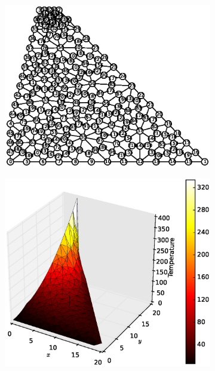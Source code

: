 \documentclass[10pt, a4paper]{article}
\begin{document}
\begin{figure}[H]
\centering
	\begin{subfigure}[H]{0.3\textwidth}
		\includegraphics[width=1.2\textwidth]{fig/exdam3_1.eps}
		\caption{}
		\label{fig:1}
	\end{subfigure}
	\begin{subfigure}[H]{0.33\textwidth}
		\includegraphics[width=\textwidth]{fig/exdam3_2.eps}
		\caption{}
		\label{fig:2}
	\end{subfigure}

\end{figure}
\end{document}
